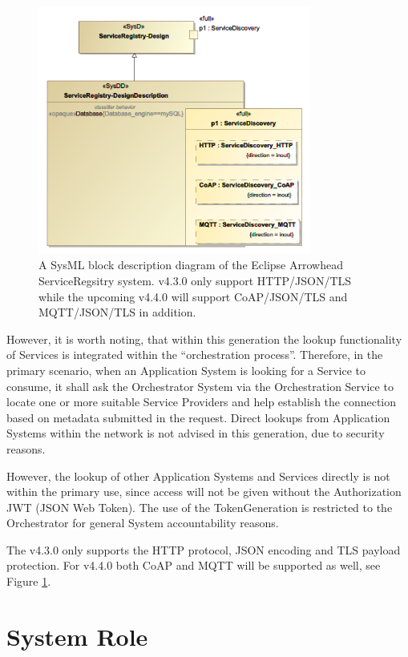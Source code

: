 \documentclass[a4paper]{arrowhead}
\begin{document}
\begin{figure}[t!]
  \centering 
  \includegraphics[width=0.8\textwidth]{figures/ServiceRegistry_SysDD}
  \caption{A SysML block description diagram of the Eclipse Arrowhead
    ServiceRegsitry system. v4.3.0 only support HTTP/JSON/TLS while
    the upcoming v4.4.0 will support CoAP/JSON/TLS and MQTT/JSON/TLS
    in addition.}
  \label{fig:ServiceRegistrySysDD}
\end{figure}
%

However, it is worth noting, that within this generation the lookup functionality of Services is integrated within the “orchestration process”. Therefore, in the primary scenario, when an Application System is looking for a Service to consume, it shall ask the Orchestrator System via the Orchestration Service to locate one or more suitable Service Providers and help establish the connection based on metadata submitted in the request. Direct lookups from Application Systems within the network is not advised in this generation, due to security reasons.

However, the lookup of other Application Systems and Services directly is not within the primary use, since access will not be given without the Authorization JWT (JSON Web Token). The use of the TokenGeneration is restricted to the Orchestrator for general System accountability reasons.

The v4.3.0 only supports the HTTP protocol, JSON encoding and TLS
payload protection. For v4.4.0 both CoAP and MQTT will be supported as
well, see Figure \ref{fig:ServiceRegistrySysDD}.
%
%


\section{System Role}
\label{sec:role}
\end{document}
